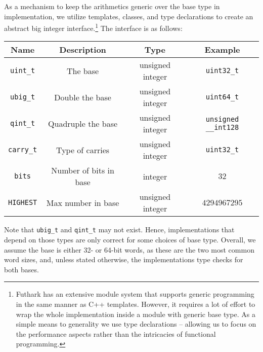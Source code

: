 As a mechanism to keep the arithmetics generic over the base type in
implementation, we utilize templates, classes, and type declarations to create
an abstract big integer interface.\footnote{Futhark has an extensive module
  system that supports generic programming in the same manner as C++
  templates. However, it requires a lot of effort to wrap the whole
  implementation inside a module with generic base type. As a simple means to
  generality we use type declarations -- allowing us to focus on the performance
  aspects rather than the intricacies of functional programming.} The interface
is as follows:
\begin{center}
  \begin{tabular}{cccc}
    Name & Description & Type & Example\\
    \hline
    \texttt{uint\_t} & The base & unsigned integer & \texttt{uint32\_t}\\
    \texttt{ubig\_t} & Double the base & unsigned integer & \texttt{uint64\_t}\\
    \texttt{qint\_t} & Quadruple the base & unsigned integer & \texttt{unsigned \_\_int128}\\
    \texttt{carry\_t} & Type of carries & unsigned integer & \texttt{uint32\_t}\\
    \texttt{bits} & Number of bits in base & integer & $32$\\
    \texttt{HIGHEST} & Max number in base & unsigned integer & $4294967295$\\
  \end{tabular}
  \end{center}
  Note that \texttt{ubig\_t} and \texttt{qint\_t} may not exist. Hence,
  implementations that depend on those types are only correct for some choices
  of base type. Overall, we assume the base is either 32- or 64-bit words, as
  these are the two most common word sizes, and, unless stated otherwise, the
  implementations type checks for both bases.

